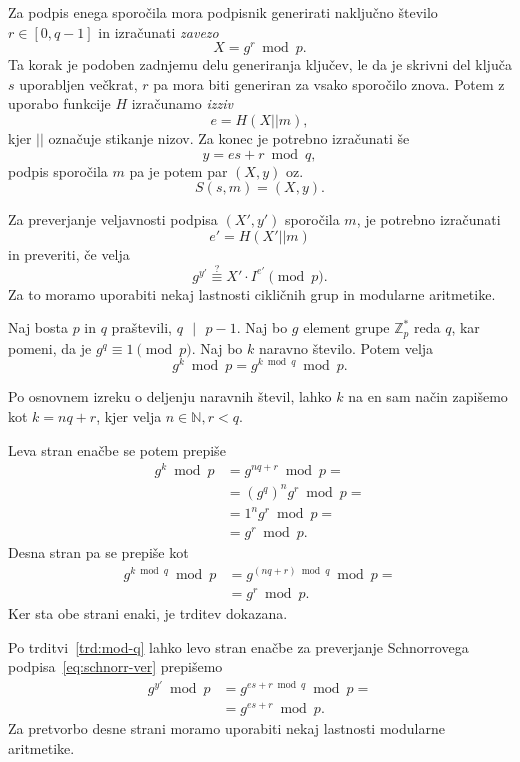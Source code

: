 \documentclass[isrm2, tisk]{fmfdelo}
\newcommand{\N}{\mathbb N}
\newcommand{\Z}{\mathbb Z}
\begin{document}
Za podpis enega sporočila mora podpisnik generirati naključno število $r \in [0, q-1]$ in izračunati 
\textit{zavezo} 
$$ 
X = g^r \bmod p.
$$ 
Ta korak je podoben zadnjemu delu generiranja ključev, le da je skrivni del ključa $s$ uporabljen 
večkrat, $r$ pa mora biti generiran za vsako sporočilo znova. Potem z uporabo funkcije $H$ izračunamo 
\textit{izziv} 
$$
e = H(X || m),
$$ 
kjer $||$ označuje stikanje nizov. Za konec je potrebno izračunati še 
$$ 
y = es + r \bmod q, 
$$
podpis sporočila $m$ pa je potem par $(X, y)$ oz.\ 
$$ 
S(s, m) = (X, y).
$$

Za preverjanje veljavnosti podpisa $(X', y')$ sporočila $m$, je potrebno izračunati 
$$ 
e' = H(X' || m)
$$
in preveriti, če velja 
\begin{equation}
    g^{y'} \stackrel{?}{\equiv} X' \cdot I^{e'} \pmod p. \label{eq:schnorr-ver}
\end{equation}
Za to moramo uporabiti nekaj lastnosti cikličnih grup in modularne aritmetike.
\begin{trditev}
\label{trd:mod-q}
    Naj bosta $p$ in $q$ praštevili, $q \text{ }|\text{ } p - 1$. Naj bo $g$ element grupe $\Z_p^*$ 
    reda $q$, kar pomeni, da je $g^q \equiv 1 \pmod p$. Naj bo $k$ naravno število. Potem velja 
    $$ 
    g^k \bmod p = g^{k \bmod q} \bmod p.
    $$
\end{trditev}
\begin{dokaz}
    Po osnovnem izreku o deljenju naravnih števil, lahko $k$ na en sam način zapišemo kot $k = nq + r$, 
    kjer velja $n \in \N, r < q$.

    Leva stran enačbe se potem prepiše 
    \begin{align*}
        g^k \bmod p &= g^{nq + r} \bmod p = \\ 
                    &= (g^q)^n g^r \bmod p = \\ 
                    &= 1^n g^r \bmod p = \\ 
                    &= g^r \bmod p.
    \end{align*}
    Desna stran pa se prepiše kot 
    \begin{align*}
        g^{k \bmod q} \bmod p &= g^{(nq + r) \bmod q} \bmod p = \\ 
                              &= g^r \bmod p.
    \end{align*}
    Ker sta obe strani enaki, je trditev dokazana.
\end{dokaz}

Po trditvi~\ref{trd:mod-q} lahko levo stran enačbe za preverjanje Schnorrovega podpisa~\eqref{eq:schnorr-ver}
prepišemo
\begin{align*}
    g^{y'} \bmod p &= g^{es + r \bmod q} \bmod p = \\ 
                   &= g^{es + r} \bmod p. 
\end{align*}
Za pretvorbo desne strani moramo uporabiti nekaj lastnosti modularne aritmetike.
\end{document}
